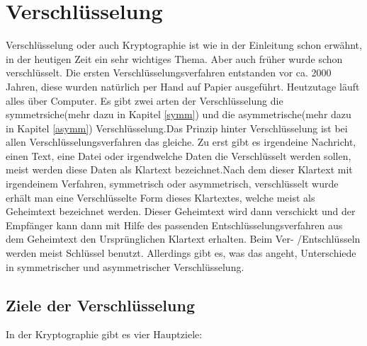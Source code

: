 \documentclass[a4paper,12pt,titlepage]{article}
\begin{document}
\section{Verschlüsselung}
Verschlüsselung oder auch Kryptographie ist wie in der Einleitung schon erwähnt, in der heutigen Zeit ein sehr wichtiges Thema. Aber auch früher wurde schon verschlüsselt. Die ersten Verschlüsselungsverfahren entstanden vor ca. 2000 Jahren, diese wurden natürlich per Hand auf Papier ausgeführt. Heutzutage läuft alles über Computer. \newline Es gibt zwei arten der Verschlüsselung die symmetrsiche(mehr dazu in Kapitel \ref{symm}) und die asymmetrische(mehr dazu in Kapitel \ref{asymm}) Verschlüsselung.Das Prinzip hinter Verschlüsselung ist bei allen Verschlüsselungsverfahren das gleiche. Zu erst gibt es irgendeine Nachricht, einen Text, eine Datei oder irgendwelche Daten die Verschlüsselt werden sollen, meist werden diese Daten als Klartext bezeichnet.Nach dem dieser Klartext mit irgendeinem Verfahren, symmetrisch oder asymmetrisch, verschlüsselt wurde erhält man eine Verschlüsselte Form dieses Klartextes, welche meist als Geheimtext bezeichnet werden. Dieser Geheimtext wird dann verschickt und der Empfänger kann dann mit Hilfe des passenden Entschlüsselungsverfahren aus dem Geheimtext den Ursprünglichen Klartext erhalten. Beim Ver- /Entschlüsseln werden meist Schlüssel benutzt. Allerdings gibt es, was das angeht, Unterschiede in symmetrischer und asymmetrischer Verschlüsselung.

\subsection{Ziele der Verschlüsselung}
In der Kryptographie gibt es vier Hauptziele:
\end{document}

